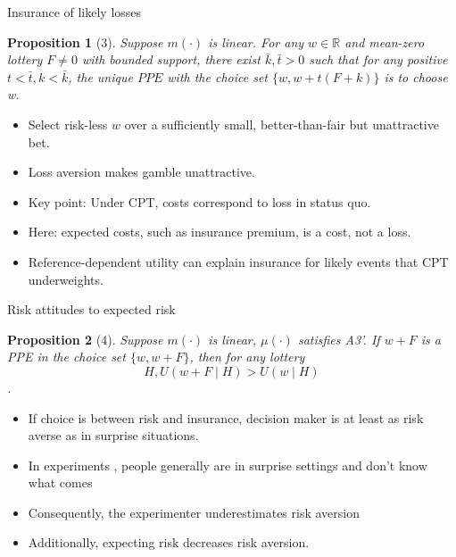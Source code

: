\documentclass[11pt, aspectratio=169]{beamer}
\newtheorem{proposition}{Proposition}
\begin{document}
\begin{frame}{Insurance of likely losses}
    \begin{proposition}[3]
    Suppose $m(\cdot)$ is linear. For any $w \in \mathbb{R}$ and mean-zero lottery $F \neq 0$ with bounded support,     there exist $\bar{k}, \bar{t}>0$ such that for any positive $t<\bar{t}, k<\bar{k}$,
    the unique $P P E$ with the choice set $\{w, w+t(F+k)\}$ is to choose w.\\
    \end{proposition}
    \begin{itemize}
        \item Select risk-less $w$ over a sufficiently small, better-than-fair but unattractive bet.\medskip
        \item Loss aversion makes gamble unattractive.\medskip
        \item Key point:  Under CPT, costs correspond to loss in status quo.\medskip
        \item Here: expected costs, such as insurance premium, is a cost, not a loss.\medskip
        \item Reference-dependent utility can explain insurance for likely events that CPT underweights.\medskip
	\end{itemize}
\end{frame}

\begin{frame}{Risk attitudes to expected risk}
    \begin{proposition}[4]
        Suppose $m(\cdot)$ is linear, $\mu(\cdot)$ satisfies A3'.
        If $w+F$ is a PPE in the choice set $\{w, w+F\}$, then for any lottery \[H, U(w+F \mid H)>U(w \mid H)\].\\
    \end{proposition}
    \begin{itemize}
	\item If choice is between risk and insurance, decision maker is at least as risk averse as in  surprise situations.\medskip
	 \item In experiments , people generally are in surprise settings and don't know what comes\medskip
\item Consequently, the experimenter underestimates risk aversion\medskip
\item    Additionally, expecting risk decreases risk aversion.\medskip
    \end{itemize}
\end{frame}
\end{document}
